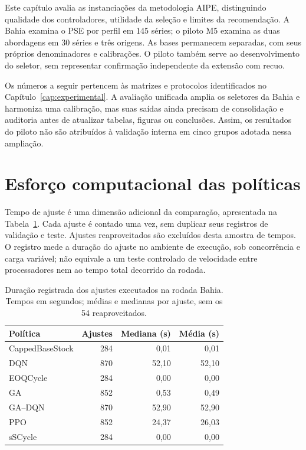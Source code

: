 
Este capítulo avalia as instanciações da metodologia AIPE, distinguindo qualidade dos controladores, utilidade da seleção e limites da recomendação. A Bahia examina o PSE por perfil em 145 séries; o piloto M5 examina as duas abordagens em 30 séries e três origens. As bases permanecem separadas, com seus próprios denominadores e calibrações. O piloto também serve ao desenvolvimento do seletor, sem representar confirmação independente da extensão com recuo.

Os números a seguir pertencem às matrizes e protocolos identificados no Capítulo~\ref{cap:experimental}. A avaliação unificada amplia os seletores da Bahia e harmoniza uma calibração, mas suas saídas ainda precisam de consolidação e auditoria antes de atualizar tabelas, figuras ou conclusões. Assim, os resultados do piloto não são atribuídos à validação interna em cinco grupos adotada nessa ampliação.





\section{Esforço computacional das políticas}

\label{sec:computational_results}

Tempo de ajuste é uma dimensão adicional da comparação, apresentada na Tabela~\ref{tab:fit_time}. Cada ajuste é contado uma vez, sem duplicar seus registros de validação e teste. Ajustes reaproveitados são excluídos desta amostra de tempos. O registro mede a duração do ajuste no ambiente de execução, sob concorrência e carga variável; não equivale a um teste controlado de velocidade entre processadores nem ao tempo total decorrido da rodada.

\begin{table}[htbp]\centering\small
\caption{Duração registrada dos ajustes executados na rodada Bahia. Tempos em segundos; médias e medianas por ajuste, sem os 54 reaproveitados.}
\label{tab:fit_time}
\begin{tabular}{@{}lrrr@{}}\toprule
Política & Ajustes & Mediana (s) & Média (s)\\\midrule
CappedBaseStock & 284 & 0,01 & 0,01\\
DQN & 870 & 52,10 & 52,10\\
EOQCycle & 284 & 0,00 & 0,00\\
GA & 852 & 0,53 & 0,49\\
GA--DQN & 870 & 52,90 & 52,90\\
PPO & 852 & 24,37 & 26,03\\
sSCycle & 284 & 0,00 & 0,00\\
\bottomrule\end{tabular}\end{table}

